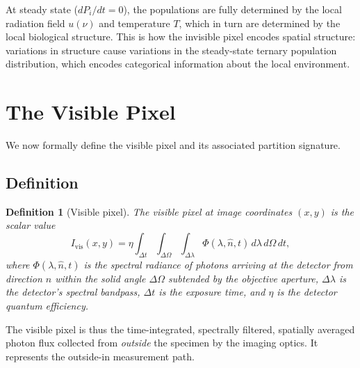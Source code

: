 \documentclass[11pt,twocolumn,a4paper]{article}
\newtheorem{definition}{Definition}
\begin{document}
At steady state ($dP_i/dt = 0$), the populations are fully determined by the local radiation field $u(\nu)$ and temperature $T$, which in turn are determined by the local biological structure.
This is how the invisible pixel encodes spatial structure: variations in structure cause variations in the steady-state ternary population distribution, which encodes categorical information about the local environment.



\section{The Visible Pixel}\label{sec:visible}

We now formally define the visible pixel and its associated partition signature.

\subsection{Definition}

\begin{definition}[Visible pixel]\label{def:vispixel}
The visible pixel at image coordinates $(x, y)$ is the scalar value
\begin{equation}\label{eq:vispixel}
I_{\mathrm{vis}}(x,y) = \eta \int_{\Delta t} \int_{\Delta\Omega} \int_{\Delta\lambda} \Phi(\lambda, \hat{n}, t)\, d\lambda\, d\Omega\, dt,
\end{equation}
where $\Phi(\lambda, \hat{n}, t)$ is the spectral radiance of photons arriving at the detector from direction $\hat{n}$ within the solid angle $\Delta\Omega$ subtended by the objective aperture, $\Delta\lambda$ is the detector's spectral bandpass, $\Delta t$ is the exposure time, and $\eta$ is the detector quantum efficiency.
\end{definition}

The visible pixel is thus the time-integrated, spectrally filtered, spatially averaged photon flux collected from \emph{outside} the specimen by the imaging optics.
It represents the outside-in measurement path.
\end{document}
